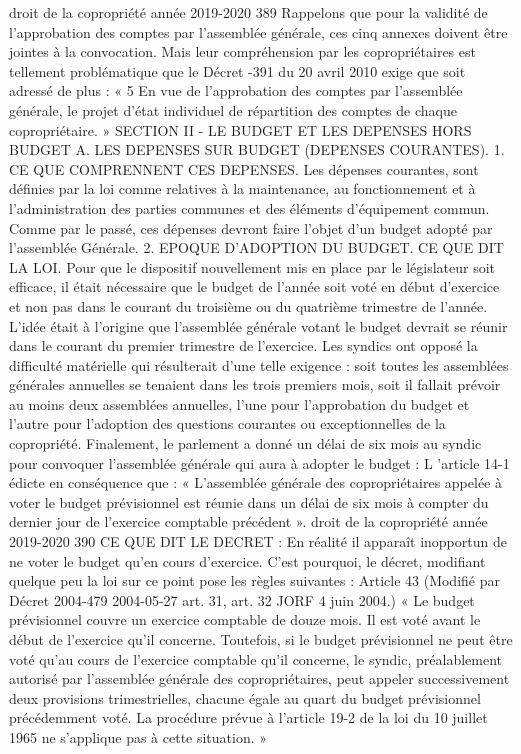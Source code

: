 droit de la copropriété année 2019-2020
389
Rappelons que pour la validité de l’approbation des comptes par l’assemblée générale, ces cinq annexes doivent être jointes à la convocation.
Mais leur compréhension par les copropriétaires est tellement problématique que le Décret -391 du 20 avril 2010 exige que soit adressé de plus :
« 5 \no En vue de l’approbation des comptes par l’assemblée générale, le projet d’état individuel de répartition des comptes de chaque copropriétaire. »
SECTION II - LE BUDGET ET LES DEPENSES HORS BUDGET
A. LES DEPENSES SUR BUDGET (DEPENSES COURANTES).
1. CE QUE COMPRENNENT CES DEPENSES.
Les dépenses courantes, sont définies par la loi comme relatives à la maintenance, au fonctionnement et à l'administration des parties communes et des éléments d'équipement commun.
Comme par le passé, ces dépenses devront faire l’objet d’un budget adopté par l’assemblée Générale.
2. EPOQUE D’ADOPTION DU BUDGET.
CE QUE DIT LA LOI.
Pour que le dispositif nouvellement mis en place par le législateur soit efficace, il était nécessaire que le budget de l'année soit voté en début d'exercice et non pas dans le courant du troisième ou du quatrième trimestre de l'année.
L'idée était à l'origine que l'assemblée générale votant le budget devrait se réunir dans le courant du premier trimestre de l'exercice. Les syndics ont opposé la difficulté matérielle qui résulterait d'une telle exigence : soit toutes les assemblées générales annuelles se tenaient dans les trois premiers mois, soit il fallait prévoir au moins deux assemblées annuelles, l'une pour l'approbation du budget et l'autre pour l'adoption des questions courantes ou exceptionnelles de la copropriété.
Finalement, le parlement a donné un délai de six mois au syndic pour convoquer l'assemblée générale qui aura à adopter le budget :
L ’article 14-1 édicte en conséquence que : « L'assemblée générale des copropriétaires appelée à voter le budget prévisionnel est réunie dans un délai de six mois à compter du dernier jour de l'exercice comptable précédent ».
droit de la copropriété année 2019-2020
390
CE QUE DIT LE DECRET :
En réalité il apparaît inopportun de ne voter le budget qu’en cours d’exercice. C’est pourquoi, le décret, modifiant quelque peu la loi sur ce point pose les règles suivantes :
Article 43 (Modifié par Décret 2004-479 2004-05-27 art. 31, art. 32 JORF 4 juin 2004.)
« Le budget prévisionnel couvre un exercice comptable de douze mois. Il est voté avant le début de l'exercice qu'il concerne.
Toutefois, si le budget prévisionnel ne peut être voté qu'au cours de l'exercice comptable qu'il concerne, le syndic, préalablement autorisé par l'assemblée générale des copropriétaires, peut appeler successivement deux provisions trimestrielles, chacune égale au quart du budget prévisionnel précédemment voté. La procédure prévue à l'article 19-2 de la loi du 10 juillet 1965 ne s'applique pas à cette situation. »
